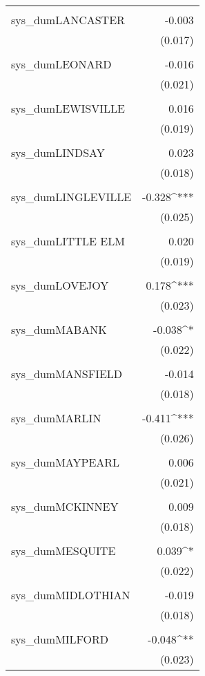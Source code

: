\begin{table}[!htbp]
\begin{tabular}{@{\extracolsep{5pt}}lD{.}{.}{-3} }
  & \\ 
 sys\_dumLANCASTER & -0.003 \\ 
  & (0.017) \\ 
  & \\ 
 sys\_dumLEONARD & -0.016 \\ 
  & (0.021) \\ 
  & \\ 
 sys\_dumLEWISVILLE & 0.016 \\ 
  & (0.019) \\ 
  & \\ 
 sys\_dumLINDSAY & 0.023 \\ 
  & (0.018) \\ 
  & \\ 
 sys\_dumLINGLEVILLE & -0.328^{***} \\ 
  & (0.025) \\ 
  & \\ 
 sys\_dumLITTLE ELM & 0.020 \\ 
  & (0.019) \\ 
  & \\ 
 sys\_dumLOVEJOY & 0.178^{***} \\ 
  & (0.023) \\ 
  & \\ 
 sys\_dumMABANK & -0.038^{*} \\ 
  & (0.022) \\ 
  & \\ 
 sys\_dumMANSFIELD & -0.014 \\ 
  & (0.018) \\ 
  & \\ 
 sys\_dumMARLIN & -0.411^{***} \\ 
  & (0.026) \\ 
  & \\ 
 sys\_dumMAYPEARL & 0.006 \\ 
  & (0.021) \\ 
  & \\ 
 sys\_dumMCKINNEY & 0.009 \\ 
  & (0.018) \\ 
  & \\ 
 sys\_dumMESQUITE & 0.039^{*} \\ 
  & (0.022) \\ 
  & \\ 
 sys\_dumMIDLOTHIAN & -0.019 \\ 
  & (0.018) \\ 
  & \\ 
 sys\_dumMILFORD & -0.048^{**} \\ 
  & (0.023) \\ 

\end{tabular}
\end{table}
